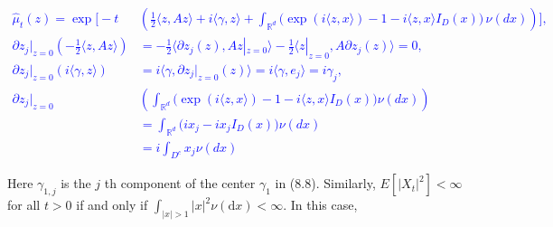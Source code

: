 \documentclass[a4paper,11pt]{article}
\begin{document}
\textcolor{blue}{
    \small
    \begin{align*}
        \widehat{\mu}_{t}(z)                                                      =
        \operatorname{e x p} \biggl[-t                                           & \left(\frac{1} {2} \langle z, A z \rangle +i \langle\gamma, z \rangle+\int_{\mathbb{R}^{d}} \bigl( \operatorname{e x p} ( i \langle z, x \rangle)-1-i \langle z, x \rangle I_{D} ( x ) \bigr) \, \nu( d x )\right) \biggr], \\
        \partial z_{j}|_{z=0}\left( -\frac{1} {2} \langle z, A z \rangle \right) & =
        -\frac{1} {2} \langle \partial z_{j}(z), A z|_{z=0} \rangle
        -\frac{1} {2} \langle z|_{z=0}, A \partial z_{j}(z) \rangle=0,                                                                                                                                                                                                                                         \\
        \partial z_{j}|_{z=0}\left( i \langle \gamma, z \rangle \right)          & = i \langle\gamma, \partial z_{j}|_{z=0}(z) \rangle =
        i \langle\gamma, e_{j}  \rangle = i \gamma_{j}                           ,                                                                                                                                                                                                                             \\
        \partial z_{j}|_{z=0}                                                    & \left( \int_{\mathbb{R}^{d}}                         \bigl( \operatorname{e x p} ( i \langle z, x \rangle)-1-i \langle z, x \rangle I_{D} ( x ) \bigr) \nu(dx) \right)                                                      \\
                                                                                 & = \int_{\mathbb{R}^{d}}                         \bigl( ix_{j}-i x_{j}I_{D} ( x ) \bigr) \nu(dx)                                                                                                                             \\
                                                                                 & = i\int_{D^{c}} x_{j} \nu(dx)
    \end{align*}
}

Here $\gamma_{1, j}$ is the $j$ th
component of the center $\gamma_{1}$ in (8.8). Similarly, $E\left[\left|X_{t}\right|^{2}\right]<\infty$
for all $t>0$ if and only if $\int_{|x|>1}|x|^{2} \nu(\mathrm{d} x)<\infty$. In this case,
\end{document}
